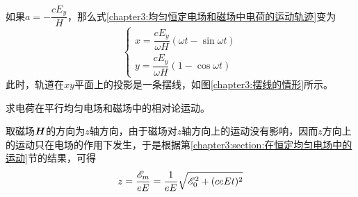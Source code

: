 如果$a=-\dfrac{cE_y}{H}$，那么式\eqref{chapter3:均匀恒定电场和磁场中电荷的运动轨迹}变为
\begin{equation}
\begin{cases}
	x = \dfrac{cE_y}{\omega H}(\omega t-\sin \omega t) \\[1.5ex]
	y = \dfrac{cE_y}{\omega H}(1-\cos\omega t)
\end{cases}
\end{equation}
此时，轨道在$xy$平面上的投影是一条摆线，如图\ref{chapter3:摆线的情形}所示。

\begin{example}
求电荷在平行均匀电场和磁场中的相对论运动。
\end{example}
\begin{solution}
取磁场$\boldsymbol{H}$的方向为$z$轴方向，由于磁场对$z$轴方向上的运动没有影响，因而$z$方向上的运动只在电场的作用下发生，于是根据第\ref{chapter3:section:在恒定均匀电场中的运动}节的结果，可得
\begin{equation}
	z = \frac{\mathscr{E}_m}{eE} = \frac{1}{eE}\sqrt{\mathscr{E}_0^2+(ceEt)^2}
	\label{chapter3:例3.2在z方向上的运动}
\end{equation}


\end{solution}
